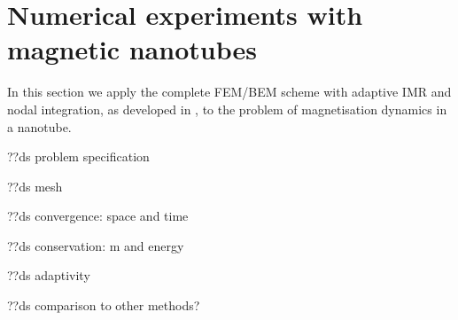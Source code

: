 \chapter{Numerical experiments with magnetic nanotubes}

In this section we apply the complete FEM/BEM scheme with adaptive IMR and nodal integration, as developed in , to the problem of magnetisation dynamics in a nanotube.


??ds problem specification


??ds mesh


??ds convergence: space and time


??ds conservation: m and energy


??ds adaptivity


??ds comparison to other methods?


